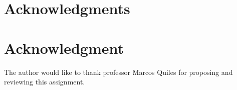 \documentclass[10pt,journal,compsoc]{IEEEtran}
\begin{document}
\ifCLASSOPTIONcompsoc
  \section*{Acknowledgments}
\else
  \section*{Acknowledgment}
\fi

The author would like to thank professor Marcos Quiles for proposing and reviewing this assignment. 


\ifCLASSOPTIONcaptionsoff
  \newpage
\fi





%
%
%
%




\end{document}
